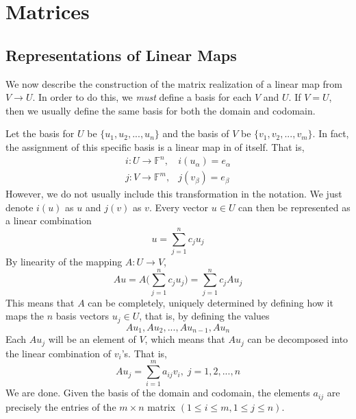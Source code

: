 \section{Matrices}

\subsection{Representations of Linear Maps} 

  We now describe the construction of the matrix realization of a linear map from $V \longrightarrow U$. In order to do this, we \textit{must} define a basis for each $V$ and $U$. If $V = U$, then we usually define the same basis for both the domain and codomain. 

  Let the basis for $U$ be $\{ u_1, u_2, ..., u_n\}$ and the basis of $V$ be $\{v_1, v_2, ..., v_m\}$. In fact, the assignment of this specific basis is a linear map in of itself. That is, 
  \begin{align*}
    i: U \longrightarrow \mathbb{F}^n, & i(u_\alpha) = e_\alpha  \\
    j: V \longrightarrow \mathbb{F}^m, & j(v_\beta) = e_\beta 
  \end{align*}
  However, we do not usually include this transformation in the notation. We just denote $i(u)$ as $u$ and $j(v)$ as $v$. Every vector $u \in U$ can then be represented as a linear combination
  \begin{equation}
    u = \sum_{j=1}^n c_j u_j
  \end{equation}
  By linearity of the mapping $A: U \longrightarrow V$, 
  \begin{equation}
    A u = A \bigg( \sum_{j=1}^n c_j u_j \bigg) = \sum_{j=1}^n c_j A u_j 
  \end{equation}
  This means that $A$ can be completely, uniquely determined by defining how it maps the $n$ basis vectors $u_j \in U$, that is, by defining the values 
  \begin{equation}
    A u_1, A u_2, ..., A u_{n-1}, A u_n
  \end{equation}
  Each $A u_j$ will be an element of $V$, which means that $A u_j$ can be decomposed into the linear combination of $v_i$'s. That is, 
  \begin{equation}
    A u_j = \sum_{i=1}^m a_{i j} v_i, \; j = 1, 2, ..., n 
  \end{equation}
  We are done. Given the basis of the domain and codomain, the elements $a_{i j}$ are precisely the entries of the $m \times n$ matrix $(1 \leq i \leq m, 1 \leq j \leq n)$. 
